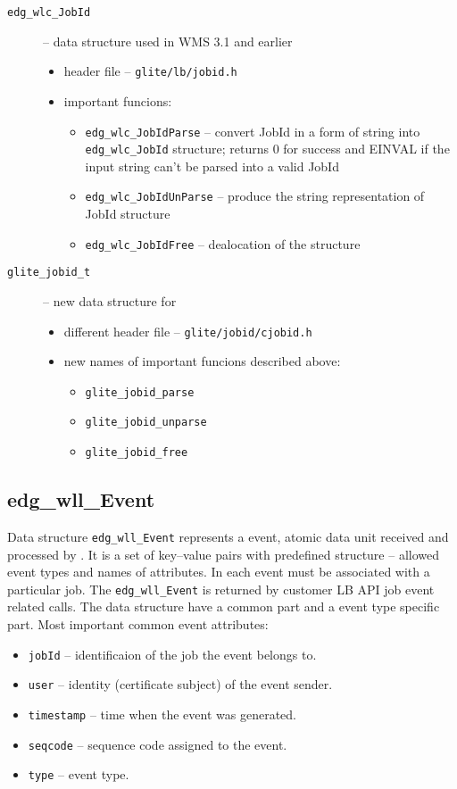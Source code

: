 \begin{description}
 \item [\texttt{edg\_wlc\_JobId}] -- data structure used in WMS 3.1 and earlier
  \begin{itemize}
   \item header file -- \texttt{glite/lb/jobid.h}
   \item important funcions:
    \begin{itemize}
     \item \texttt{edg\_wlc\_JobIdParse} -- convert JobId in a form of
      string into \texttt{edg\_wlc\_JobId} structure; returns 0 for
      success and EINVAL if the input string can't be parsed into a valid JobId
     \item \texttt{edg\_wlc\_JobIdUnParse} -- produce the string
      representation of JobId structure
     \item \texttt{edg\_wlc\_JobIdFree} -- dealocation of the structure
    \end{itemize}
  \end{itemize} 
 \item [\texttt{glite\_jobid\_t}] -- new data structure for  
  \begin{itemize}
   \item different header file -- \texttt{glite/jobid/cjobid.h}
   \item new names of important funcions described above:
    \begin{itemize}
     \item \texttt{glite\_jobid\_parse}
     \item \texttt{glite\_jobid\_unparse}
     \item \texttt{glite\_jobid\_free}
    \end{itemize}
  \end{itemize}
\end{description}

\subsection{edg\_wll\_Event}
Data structure \texttt{edg\_wll\_Event} represents a \LB event, atomic
data unit received and processed by \LB. It is a set of key--value
pairs with predefined structure -- allowed event types and names of
attributes. In \LB each event must be associated with a particular
job. The \texttt{edg\_wll\_Event} is returned by customer LB API job
event related calls. The data structure have a common part and a event
type specific part. Most important common event attributes:
\begin{itemize}
  \item \texttt{jobId} -- identificaion of the job the event belongs to.
  \item \texttt{user} -- identity (certificate subject) of the event sender.
  \item \texttt{timestamp} -- time when the event was generated.
  \item \texttt{seqcode} -- sequence code assigned to the event.
  \item \texttt{type} -- event type.
\end{itemize}

